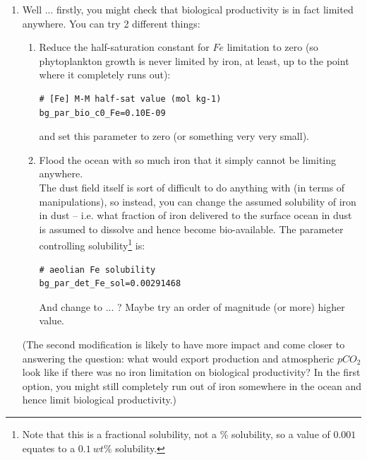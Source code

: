 \begin{enumerate}[noitemsep]

\vspace{1mm}
\item Well ... firstly, you might check that biological productivity is in fact limited anywhere. You can try 2 different things:
\begin{enumerate}[noitemsep]
\vspace{1mm}
\item Reduce the half-saturation constant for \(Fe\) limitation to zero (so phytoplankton growth is never limited by iron, at least, up to the point where it completely runs out):
\vspace{-1mm}\small\begin{verbatim}
# [Fe] M-M half-sat value (mol kg-1)
bg_par_bio_c0_Fe=0.10E-09
\end{verbatim}\normalsize\vspace{-1mm}
and set this parameter to zero (or something very very small).
\vspace{1mm}
\item Flood the ocean with so much iron that it simply cannot be limiting anywhere.
\vspace{1mm}
\\The dust field itself is sort of difficult to do anything with (in terms of manipulations), so instead, you can change the assumed solubility of iron in dust -- i.e. what fraction of iron delivered to the surface ocean in dust is assumed to dissolve and hence become bio-available. The parameter controlling solubility\footnote{Note that this is a fractional solubility, not a \% solubility, so a value of \(0.001\) equates to a \(0.1\:wt\%\) solubility.} is:
\vspace{-1mm}\small\begin{verbatim}
# aeolian Fe solubility
bg_par_det_Fe_sol=0.00291468
\end{verbatim}\normalsize\vspace{-1mm}
And change to ... ? Maybe try an order of magnitude (or more) higher value.
\end{enumerate}
\vspace{1mm}
(The second modification is likely to have more impact and come closer to answering the question: what would export production and atmospheric \(pCO_{2}\) look like if there was no iron limitation on biological productivity? In the first option, you might still completely run out of iron somewhere in the ocean and hence limit biological productivity.)


\end{enumerate}
